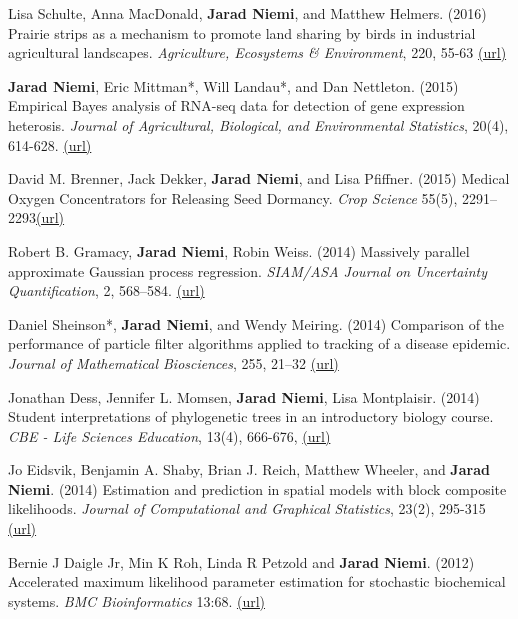 \documentclass[overlapped,line]{res}
\begin{document}
\begin{resume}
Lisa Schulte, Anna MacDonald, {\bf Jarad Niemi}, and Matthew Helmers. (2016) Prairie strips as a mechanism to promote land sharing by birds in industrial agricultural landscapes. \emph{Agriculture, Ecosystems \& Environment}, 220, 55-63 \href{http://www.sciencedirect.com/science/article/pii/S016788091630007X}{(url)}

{\bf Jarad Niemi}, Eric Mittman*, Will Landau*, and Dan Nettleton. (2015) Empirical Bayes analysis of RNA-seq data for detection of gene expression heterosis. \emph{Journal of Agricultural, Biological, and Environmental Statistics}, 20(4), 614-628. \href{http://link.springer.com/article/10.1007%2Fs13253-015-0230-5}{(url)}






David M. Brenner, Jack Dekker, {\bf Jarad Niemi}, and Lisa Pfiffner. (2015) Medical Oxygen Concentrators for Releasing Seed Dormancy. \emph{Crop Science} 55(5), 2291--2293\href{https://dl.sciencesocieties.org/publications/cs/pdfs/0/0/cropsci2014.11.0783}{(url)}

Robert B. Gramacy, {\bf Jarad Niemi}, Robin Weiss. (2014) Massively parallel approximate Gaussian process regression. \emph{SIAM/ASA Journal on Uncertainty Quantification}, 2, 568--584. \href{http://epubs.siam.org/doi/abs/10.1137/130941912}{(url)}

Daniel Sheinson*, {\bf Jarad Niemi}, and Wendy Meiring. (2014) Comparison of the performance of particle filter algorithms applied to tracking of a disease epidemic. \emph{Journal of Mathematical Biosciences}, 255, 21--32 \href{http://www.sciencedirect.com/science/article/pii/S0025556414001242}{(url)}

Jonathan Dess, Jennifer L. Momsen, {\bf Jarad Niemi}, Lisa Montplaisir. (2014) Student interpretations of phylogenetic trees in an introductory biology course. \emph{CBE - Life Sciences Education}, 13(4), 666-676, \href{http://www.lifescied.org/content/13/4/666.full?sid=7d54efe2-73cc-4823-b359-0ec4066c4e5b}{(url)}

Jo Eidsvik, Benjamin A. Shaby, Brian J. Reich, Matthew Wheeler, and {\bf Jarad Niemi}. (2014) Estimation and prediction in spatial models with block composite likelihoods. \emph{Journal of Computational and Graphical Statistics}, 23(2), 295-315 \href{http://amstat.tandfonline.com/doi/abs/10.1080/10618600.2012.760460}{(url)}


Bernie J Daigle Jr, Min K Roh, Linda R Petzold and {\bf Jarad Niemi}. (2012) Accelerated maximum likelihood parameter estimation for stochastic biochemical systems. \emph{BMC Bioinformatics} 13:68. \href{http://www.biomedcentral.com/1471-2105/13/68}{(url)}


\end{resume}
\end{document}
